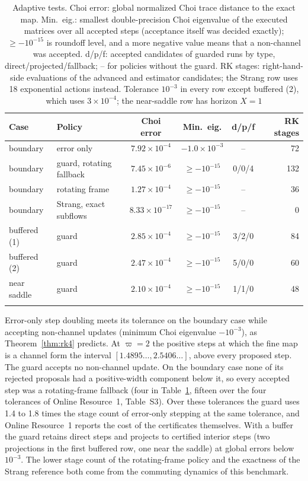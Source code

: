 \documentclass[pdflatex,sn-mathphys-num]{sn-jnl}
\theoremstyle{thmstyleone}
\theoremstyle{thmstylethree}
\theoremstyle{thmstyletwo}
\begin{document}
\begin{table}[tbp]
\caption{Adaptive tests. Choi error: global normalized Choi trace distance to the exact map. Min.\ eig.: smallest double-precision Choi eigenvalue of the executed matrices over all accepted steps (acceptance itself was decided exactly); $\ge-10^{-15}$ is roundoff level, and a more negative value means that a non-channel was accepted. d/p/f: accepted candidates of guarded runs by type, direct/projected/fallback; -- for policies without the guard. RK stages: right-hand-side evaluations of the advanced and estimator candidates; the Strang row uses 18 exponential actions instead. Tolerance $10^{-3}$ in every row except buffered (2), which uses \mbox{$3\times10^{-4}$}; the near-saddle row has horizon $X=1$}\label{tab:adaptive}
\footnotesize
\begin{tabular*}{\textwidth}{@{\extracolsep\fill}llcccr}
\toprule
Case & Policy & Choi error & Min.\ eig. & d/p/f & RK stages \\
\midrule
boundary & error only & $7.92\times10^{-4}$ & $-1.0\times10^{-3}$ & -- & 72 \\
boundary & guard, rotating fallback & $7.45\times10^{-6}$ & $\ge-10^{-15}$ & 0/0/4 & 132 \\
boundary & rotating frame & $1.27\times10^{-4}$ & $\ge-10^{-15}$ & -- & 36 \\
boundary & Strang, exact subflows & $8.33\times10^{-17}$ & $\ge-10^{-15}$ & -- & 0 \\
buffered (1) & guard & $2.85\times10^{-4}$ & $\ge-10^{-15}$ & 3/2/0 & 84 \\
buffered (2) & guard & $2.47\times10^{-4}$ & $\ge-10^{-15}$ & 5/0/0 & 60 \\
near saddle & guard & $2.10\times10^{-4}$ & $\ge-10^{-15}$ & 1/1/0 & 48 \\
\botrule
\end{tabular*}
\end{table}

Error-only step doubling meets its tolerance on the boundary case while accepting non-channel updates (minimum Choi eigenvalue $-10^{-3}$), as Theorem~\ref{thm:rk4} predicts. At $\varpi=2$ the positive steps at which the fine map is a channel form the interval $[1.4895\ldots,2.5406\ldots]$, above every proposed step. The guard accepts no non-channel update. On the boundary case none of its rejected proposals had a positive-width component below it, so every accepted step was a rotating-frame fallback (four in Table~\ref{tab:adaptive}, fifteen over the four tolerances of Online Resource~1, Table~S3). Over these tolerances the guard uses 1.4 to 1.8 times the stage count of error-only stepping at the same tolerance, and Online Resource~1 reports the cost of the certificates themselves. With a buffer the guard retains direct steps and projects to certified interior steps (two projections in the first buffered row, one near the saddle) at global errors below $10^{-3}$. The lower stage count of the rotating-frame policy and the exactness of the Strang reference both come from the commuting dynamics of this benchmark.
\end{document}
